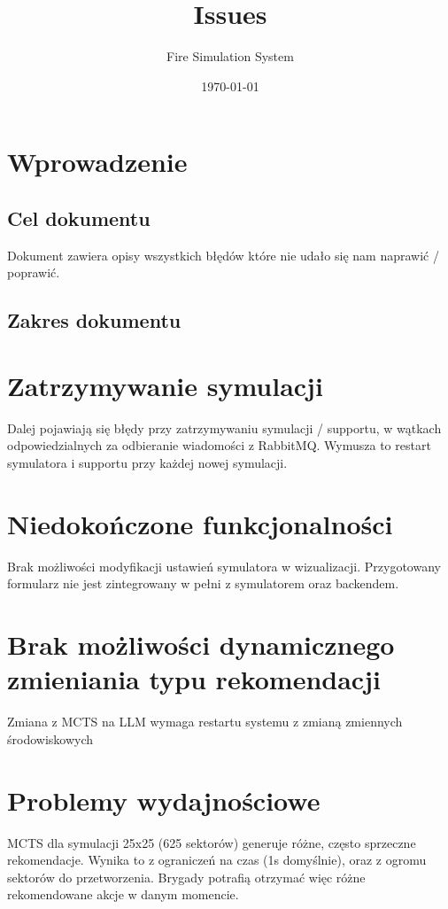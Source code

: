 \documentclass[11pt,a4paper]{article}
\title{Issues}
\author{Fire Simulation System}
\date{\today}
\begin{document}
\maketitle
\newpage

\section{Wprowadzenie}

\subsection{Cel dokumentu}

Dokument zawiera opisy wszystkich błędów które nie udało się nam naprawić / poprawić.
\subsection{Zakres dokumentu}

\section{Zatrzymywanie symulacji}
Dalej pojawiają się błędy przy zatrzymywaniu symulacji / supportu, w wątkach 
odpowiedzialnych za odbieranie wiadomości z RabbitMQ. Wymusza to restart symulatora i supportu przy każdej nowej symulacji. 

\section{Niedokończone funkcjonalności}
Brak możliwości modyfikacji ustawień symulatora w wizualizacji. Przygotowany formularz nie jest 
zintegrowany w pełni z symulatorem oraz backendem. 

\section{Brak możliwości dynamicznego zmieniania typu rekomendacji}
Zmiana z MCTS na LLM wymaga restartu systemu z zmianą zmiennych środowiskowych 

\section{Problemy wydajnościowe}
MCTS dla symulacji 25x25 (625 sektorów) generuje różne, często sprzeczne rekomendacje. Wynika to z ograniczeń na czas (1s domyślnie), oraz z ogromu sektorów do przetworzenia. Brygady potrafią otrzymać więc różne rekomendowane akcje w danym momencie. 
\end{document}
